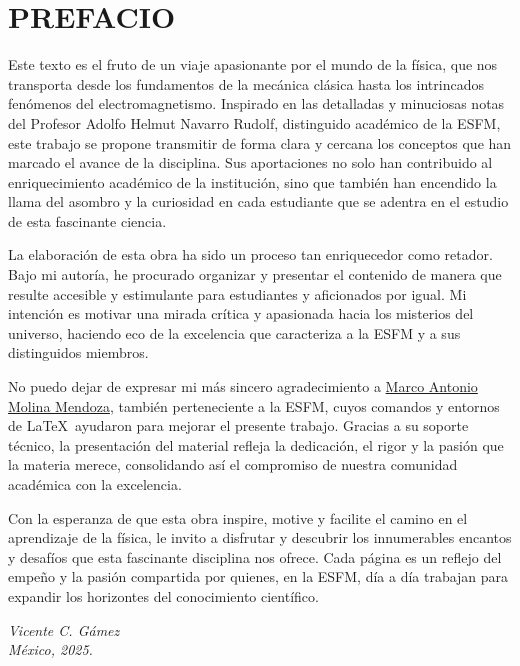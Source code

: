 \chapter*{PREFACIO}

Este texto es el fruto de un viaje apasionante por el mundo de la física, que nos transporta desde los fundamentos de la mecánica clásica hasta los intrincados fenómenos del electromagnetismo. Inspirado en las detalladas y minuciosas notas del Profesor Adolfo Helmut Navarro Rudolf, distinguido académico de la ESFM, este trabajo se propone transmitir de forma clara y cercana los conceptos que han marcado el avance de la disciplina. Sus aportaciones no solo han contribuido al enriquecimiento académico de la institución, sino que también han encendido la llama del asombro y la curiosidad en cada estudiante que se adentra en el estudio de esta fascinante ciencia.

La elaboración de esta obra ha sido un proceso tan enriquecedor como retador. Bajo mi autoría, he procurado organizar y presentar el contenido de manera que resulte accesible y estimulante para estudiantes y aficionados por igual. Mi intención es motivar una mirada crítica y apasionada hacia los misterios del universo, haciendo eco de la excelencia que caracteriza a la ESFM y a sus distinguidos miembros.

No puedo dejar de expresar mi más sincero agradecimiento a \href{https://github.com/antobno}{\color{mainc}Marco Antonio Molina Mendoza}, también perteneciente a la ESFM, cuyos comandos y entornos de \LaTeX\ ayudaron para mejorar el presente trabajo. Gracias a su soporte técnico, la presentación del material refleja la dedicación, el rigor y la pasión que la materia merece, consolidando así el compromiso de nuestra comunidad académica con la excelencia.

Con la esperanza de que esta obra inspire, motive y facilite el camino en el aprendizaje de la física, le invito a disfrutar y descubrir los innumerables encantos y desafíos que esta fascinante disciplina nos ofrece. Cada página es un reflejo del empeño y la pasión compartida por quienes, en la ESFM, día a día trabajan para expandir los horizontes del conocimiento científico.%

\vspace{2ex}

\begin{flushright}
    \cafe\selectfont\itshape Vicente C. Gámez \\
    México, 2025.
\end{flushright}

\cleardoublepage